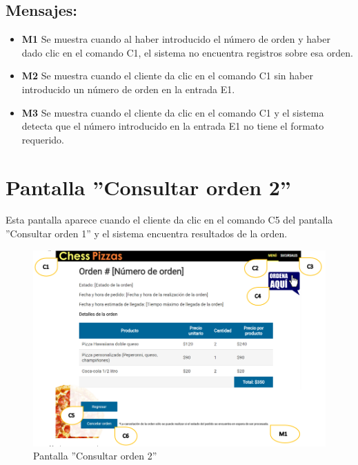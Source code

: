 \documentclass[oneside,10pt]{book}
\begin{document}
\subsection{Mensajes:}
\begin{itemize}
\item \textbf{M1} Se muestra cuando al haber introducido el número de orden y haber dado clic en el comando C1, el sistema no encuentra registros sobre esa orden.
\item \textbf{M2} Se muestra cuando el cliente da clic en el comando C1 sin haber introducido un número de orden en la entrada E1.
\item \textbf{M3} Se muestra cuando el cliente da clic en el comando C1 y el sistema detecta que el número introducido en la entrada E1 no tiene el formato requerido.
\end{itemize}

\section{Pantalla ''Consultar orden 2''}

Esta pantalla aparece cuando el cliente da clic en el comando C5 del  pantalla ''Consultar orden 1'' y el sistema encuentra resultados de la orden.

\begin{figure}[htbp!]
		\centering
			\includegraphics[width=1.1\textwidth]{images/2}
		\caption{Pantalla ''Consultar orden 2''}
	\end{figure}
\end{document}

